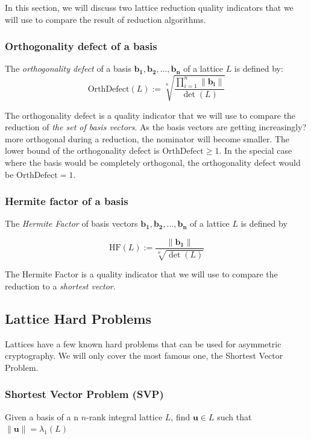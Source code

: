 \documentclass[10pt, a4paper]{article}
\newcommand{\my}[1]{{\color{blue} #1 }}
\renewcommand{\vec}[1]{\mathbf{#1}}
\begin{document}
In this section, we will discuss two lattice reduction quality indicators that we will use to compare the result of reduction algorithms.

\subsubsection{Orthogonality defect of a basis}
\label{sec:orthogonalityDefect}
The \emph{orthogonality defect} of a basis $\vec{b_1},\vec{b_2},...,\vec{b_n}$ of a lattice $L$ is defined by:
\[
    \text{OrthDefect}(L) :=  \sqrt[n]{\frac{\displaystyle\prod^{n}_{i=1} \|\vec{b_i}\| }{\det(L)}}
\]

The orthogonality defect is a quality indicator that we will use to compare the reduction of \emph{the set of basis vectors}. As the basis vectors are getting \my{increasingly? more} orthogonal during a reduction, the nominator will become smaller. The lower bound of the orthogonality defect is $\text{OrthDefect} \ge 1$. In the special case where the basis would be completely orthogonal, the orthogonality defect would be $\text{OrthDefect} = 1$.

\subsubsection{Hermite factor of a basis}
\label{sec:hermiteFactor}
The \emph{Hermite Factor} of basis vectors $\vec{b_1}, \vec{b_2},...,\vec{b_n}$ of a lattice $L$ is defined by

\[
    \text{HF}(L) := \frac{\|\vec{b_1}\|}{\sqrt[n]{\det(L)}}
\]

The Hermite Factor is a quality indicator that we will use to compare the reduction to a \emph{shortest vector}.

\subsection{Lattice Hard Problems}

Lattices have a few known hard problems that can be used for asymmetric cryptography. We will only cover the most famous one, the Shortest Vector Problem.

\subsubsection{Shortest Vector Problem (SVP)}

Given a basis of a\my{n} $n$-rank integral lattice $L$, find $\vec{u} \in L$ such that $\|\vec{u}\| = \lambda_1 (L)$
\end{document}
